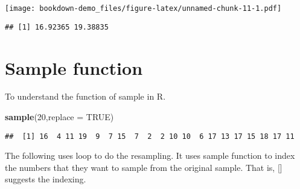 \documentclass[]{book}
\newenvironment{Shaded}{\begin{snugshade}}{\end{snugshade}}
\newcommand{\ControlFlowTok}[1]{\textcolor[rgb]{0.13,0.29,0.53}{\textbf{#1}}}
\newcommand{\DataTypeTok}[1]{\textcolor[rgb]{0.13,0.29,0.53}{#1}}
\newcommand{\DecValTok}[1]{\textcolor[rgb]{0.00,0.00,0.81}{#1}}
\newcommand{\KeywordTok}[1]{\textcolor[rgb]{0.13,0.29,0.53}{\textbf{#1}}}
\newcommand{\NormalTok}[1]{#1}
\newcommand{\OperatorTok}[1]{\textcolor[rgb]{0.81,0.36,0.00}{\textbf{#1}}}
\newcommand{\OtherTok}[1]{\textcolor[rgb]{0.56,0.35,0.01}{#1}}
\newcommand{\StringTok}[1]{\textcolor[rgb]{0.31,0.60,0.02}{#1}}
\begin{document}
\texttt{[image: bookdown-demo\_files/figure-latex/unnamed-chunk-11-1.pdf]}

\begin{verbatim}
## [1] 16.92365 19.38835
\end{verbatim}

\hypertarget{sample-function}{%
\section{Sample function}\label{sample-function}}

To understand the function of sample in R.

\begin{Shaded}
\begin{Highlighting}[]
\KeywordTok{sample}\NormalTok{(}\DecValTok{20}\NormalTok{,}\DataTypeTok{replace =} \OtherTok{TRUE}\NormalTok{)}
\end{Highlighting}
\end{Shaded}

\begin{verbatim}
##  [1] 16  4 11 19  9  7 15  7  2  2 10 10  6 17 13 17 15 18 17 11
\end{verbatim}

The following uses loop to do the resampling. It uses sample function to index the numbers that they want to sample from the original sample. That is, {[}{]} suggests the indexing.

\begin{Shaded}
\end{Shaded}
\end{document}
